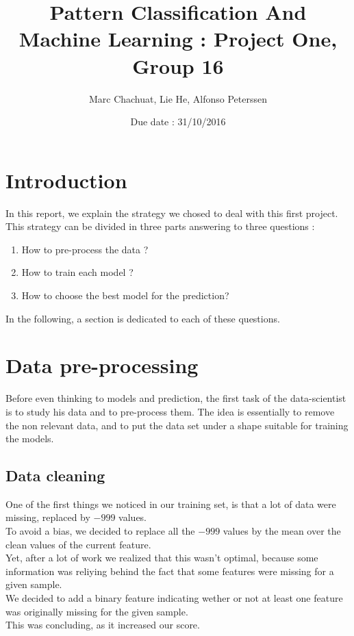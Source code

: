 \documentclass[a4paper, 10pt]{article}
\begin{document}
	
	\title{Pattern Classification And Machine Learning : Project One, Group 16}
	\author{Marc Chachuat, Lie He, Alfonso Peterssen}
	\date{Due date : 31/10/2016} 
	
	\maketitle
	
	\section{Introduction}
	In this report, we explain the strategy we chosed to deal with this first project. This strategy can be divided in three parts answering to three questions : 
	\begin{enumerate}
		\item How to pre-process the data ? 
		\item How to train each model ? 
		\item How to choose the best model for the prediction? 
	\end{enumerate}
	In the following, a section is dedicated to each of these questions. 
	
	\section{Data pre-processing}
	
	Before even thinking to models and prediction, the first task of the data-scientist is to study his data and to pre-process them. The idea is essentially to remove the non relevant data, and to put the data set under a shape suitable for training the models.
	
		\subsection{Data cleaning}
		
		One of the first things we noticed in our training set, is that a lot of data were missing, replaced by $-999$ values. 
		\\ To avoid a bias, we decided to replace all the $-999$ values by the mean over the clean values of the current feature. 
		\\ Yet, after a lot of work we realized that this wasn't optimal, because some information was reliying behind the fact that some features were missing for a given sample. 
		\\We decided to add a binary feature indicating wether or not at least one feature was originally missing for the given sample. 
		\\This was concluding, as it increased our score. 
			
\end{document}
